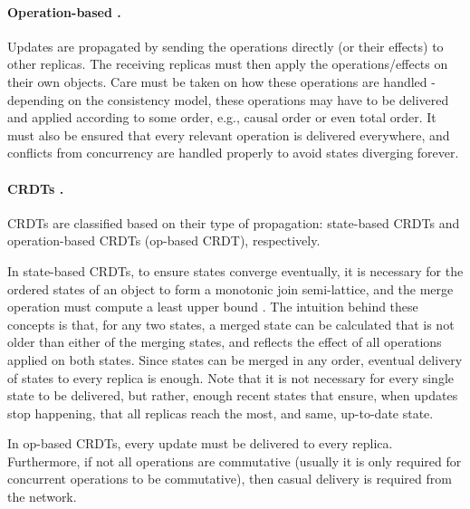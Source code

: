 \paragraph{Operation-based \cite{crdt}.}
Updates are propagated by sending the operations directly (or their effects) to other replicas.
The receiving replicas must then apply the operations/effects on their own objects.
Care must be taken on how these operations are handled - depending on the consistency model, these operations may have to be delivered and applied according to some order, e.g., causal order or even total order.
It must also be ensured that every relevant operation is delivered everywhere, and conflicts from concurrency are handled properly to avoid states diverging forever.

\paragraph{CRDTs \cite{15}.}
CRDTs are classified based on their type of propagation: state-based CRDTs and operation-based CRDTs (op-based CRDT), respectively.

In state-based CRDTs, to ensure states converge eventually, it is necessary for the ordered states of an object to form a monotonic join semi-lattice, and the merge operation must compute a least upper bound \cite{crdt, stateCRDT}. The intuition behind these concepts is that, for any two states, a merged state can be calculated that is not older than either of the merging states, and reflects the effect of all operations applied on both states.
Since states can be merged in any order, eventual delivery of states to every replica is enough.
Note that it is not necessary for every single state to be delivered, but rather, enough recent states that ensure, when updates stop happening, that all replicas reach the most, and same, up-to-date state.

In op-based CRDTs, every update must be delivered to every replica.
Furthermore, if not all operations are commutative (usually it is only required for concurrent operations to be commutative), then casual delivery is required from the network.

